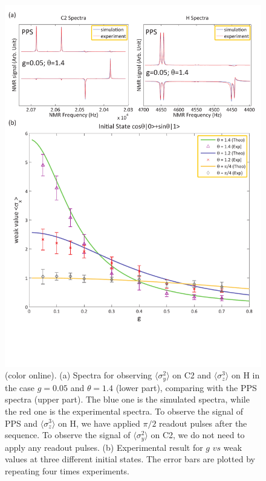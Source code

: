 \documentclass[aps,pra,12pt,onecolumn,showpacs,superscriptaddress,floatfix,footinbib,subfigure]{revtex4}
\begin{document}
\begin{figure}[h] \centering
\includegraphics[width=\columnwidth]{gweak.pdf}
\caption{(color online). (a) Spectra for observing $\langle \sigma_y^2 \rangle$ on C2 and $\langle \sigma_z^3 \rangle$ on H in the case $g=0.05$ and $\theta = 1.4$ (lower part), comparing with the PPS spectra (upper part). The blue one is the simulated spectra, while the red one is the experimental spectra. To observe the signal of PPS and $\langle \sigma_z^3 \rangle$ on H, we have applied $\pi/2$ readout pulses after the sequence. To observe the signal of $\langle \sigma_y^2 \rangle$ on C2, we do not need to apply any readout pulses. (b) Experimental result for $g$ $vs$ weak values at three different  initial states. The error bars are plotted by repeating four times experiments.}\label{gweak}
\end{figure}
\end{document}
